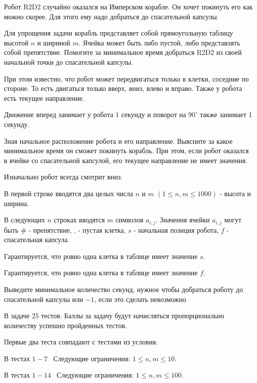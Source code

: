 
Робот R2D2 случайно оказался на Имперском корабле. Он хочет покинуть его как можно скорее. Для этого ему надо добраться до спасательной капсулы.

Для упрощения задачи корабль представляет собой прямоугольную таблицу высотой $n$ и шириной $m$. Ячейка может быть либо пустой, 
либо представлять собой препятствие. Помогите за минимальное время добраться R2D2 из своей начальной точки до спасательной капсулы.

При этом известно, что робот может передвигаться только в клетки, соседние по стороне. То есть двигаться только вверх, вниз, влево и вправо. 
Также у робота есть текущее направление.

Движение вперед занимает у робота 1 секунду и поворот на $90^{\circ}$ также занимает 1 секунду.

Зная начальное расположение робота и его направление. Выясните за какое минимальное время он сможет покинуть корабль. При этом, 
если робот оказался в ячейке со спасательной капсулой, его текущее направление не имеет значения.

Изначально робот всегда смотрит вниз.


В первой строке вводятся два целых числа $n$ и $m$ $(1 \leq n,m \leq 1000)$ - высота и ширина.

В следующих $n$ строках вводятся $m$ символов $a_{i,j}$. Значения ячейки  $a_{i,j}$ могут быть \# - препятствие, . - пустая клетка, 
$s$ - начальная позиция робота, $f$ - спасательная капсула.

Гарантируется, что ровно одна клетка в таблице имеет значение $s$.

Гарантируется, что ровно одна клетка в таблице имеет значение $f$.

\outputfmtSection

Выведите минимальное количество секунд, нужное чтобы добраться роботу до спасательной капсулы или $-1$, если это сделать невозможно

\markSection

В задаче 25 тестов. Баллы за задачу будут начисляться пропорционально количеству успешно пройденных тестов.

Первые два теста совпадают с тестами из условия.

В тестах $1-7$  Следующие ограничения: $1 \leq n,m \leq 10$.

В тестах $1-14$  Следующие ограничения: $1 \leq n,m \leq 100$.

